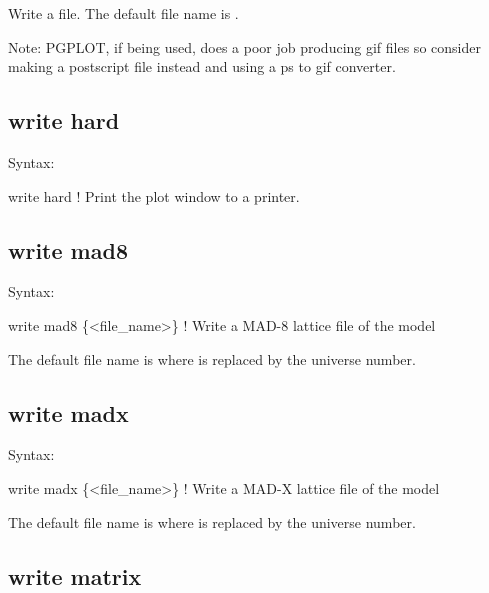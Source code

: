 {{{{{{{{{{{Write a  file. The default file name is .

Note: PGPLOT, if being used, does a poor job producing gif files so consider making a
postscript file instead and using a ps to gif converter.


\subsection{write hard}
\label{s:write.hard}

Syntax:
\begin{example}
    write hard                        ! Print the plot window to a printer.
\end{example}


\subsection{write mad8}
\label{s:write.mad8}

Syntax:
\begin{example}
    write mad8 \{<file_name>\}  ! Write a MAD-8 lattice file of the model
\end{example}

The default file name is  where \vn{\#} is replaced by the universe number. 


\subsection{write madx}
\label{s:write.madx}

Syntax:
\begin{example}
    write madx \{<file_name>\}  ! Write a MAD-X lattice file of the model
\end{example}

The default file name is  where \vn{\#} is replaced by the universe number. 


\subsection{write matrix}
\label{s:write.mat}

}}}}}}}}}}}
